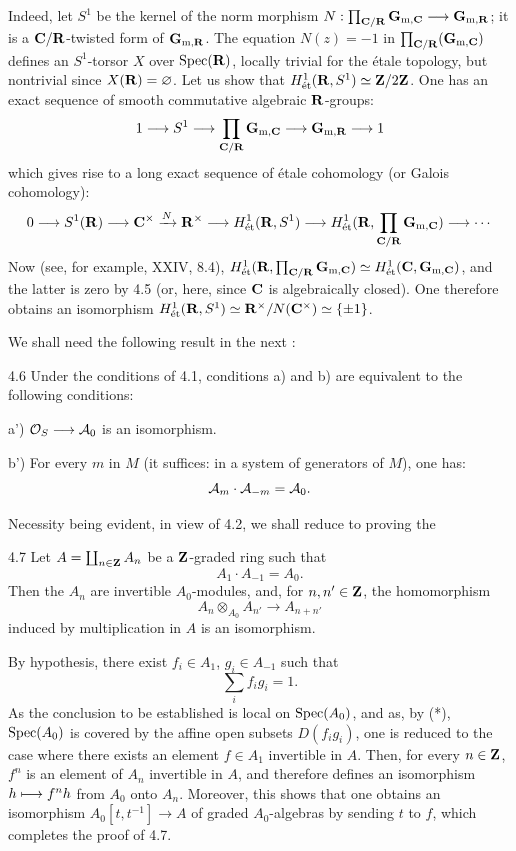 Indeed, let $S^1$ be the kernel of the norm morphism $N:\prod_{\CC/\RR}\mathbf{G}_{\mathrm{m},\CC}\to\mathbf{G}_{\mathrm{m},\RR}$; it is a $\CC/\RR$-twisted form of $\mathbf{G}_{\mathrm{m},\RR}$. The equation $N(z)=-1$ in $\prod_{\CC/\RR}(\mathbf{G}_{\mathrm{m},\CC})$ defines an $S^1$-torsor $X$ over $\Spec(\RR)$, locally trivial for the étale topology, but nontrivial since $X(\RR)=\varnothing$. Let us show that $H^1_{\mathrm{\acute et}}(\RR,S^1)\simeq\ZZ/2\ZZ$. One has an exact sequence of smooth commutative algebraic $\RR$-groups:
\[
1\to S^1\to\prod_{\CC/\RR}\mathbf{G}_{\mathrm{m},\CC}\to\mathbf{G}_{\mathrm{m},\RR}\to1
\]
which gives rise to a long exact sequence of étale cohomology (or Galois cohomology):
\[
0\to S^1(\RR)\to\CC^\times\xrightarrow{N}\RR^\times\to H^1_{\mathrm{\acute et}}(\RR,S^1)\to H^1_{\mathrm{\acute et}}(\RR,\prod_{\CC/\RR}\mathbf{G}_{\mathrm{m},\CC})\to\cdots
\]
Now (see, for example, XXIV, 8.4), $H^1_{\mathrm{\acute et}}(\RR,\prod_{\CC/\RR}\mathbf{G}_{\mathrm{m},\CC})\simeq H^1_{\mathrm{\acute et}}(\CC,\mathbf{G}_{\mathrm{m},\CC})$, and the latter is zero by 4.5 (or, here, since $\CC$ is algebraically closed). One therefore obtains an isomorphism $H^1_{\mathrm{\acute et}}(\RR,S^1)\simeq\RR^\times/N(\CC^\times)\simeq\{\pm1\}$.

We shall need the following result in the next \No:
\begin{proposition}{4.6}\label{VIII.4.6}
Under the conditions of 4.1, conditions a) and b) are equivalent to the following conditions:

a') $\OS\to\cal A_0$ is an isomorphism.

b') For every $m$ in $M$ (it suffices: in a system of generators of $M$), one has:
\[
\cal A_m\cdot\cal A_{-m}=\cal A_0.
\]
\end{proposition}
Necessity being evident, in view of 4.2, we shall reduce to proving the
\begin{corollary}{4.7}\label{VIII.4.7}
Let $A=\coprod_{n\in\ZZ}A_n$ be a $\ZZ$-graded ring such that
\[
A_1\cdot A_{-1}=A_0.
\]
Then the $A_n$ are invertible $A_0$-modules, and, for $n,n'\in\ZZ$, the homomorphism
\[
A_n\otimes_{A_0}A_{n'}\to A_{n+n'}
\]
induced by multiplication in $A$ is an isomorphism.
\end{corollary}
By hypothesis, there exist $f_i\in A_1$, $g_i\in A_{-1}$ such that
\begin{equation}\tag{*}
\sum_i f_ig_i=1.
\end{equation}
As the conclusion to be established is local on $\Spec(A_0)$, and as, by (*), $\Spec(A_0)$ is covered by the affine open subsets $D(f_ig_i)$, one is reduced to the case where there exists an element $f\in A_1$ invertible in $A$. Then, for every $n\in\ZZ$, $f^n$ is an element of $A_n$ invertible in $A$, and therefore defines an isomorphism $h\mto f^nh$ from $A_0$ onto $A_n$. Moreover, this shows that one obtains an isomorphism $A_0[t,t^{-1}]\to A$ of graded $A_0$-algebras by sending $t$ to $f$, which completes the proof of 4.7.

